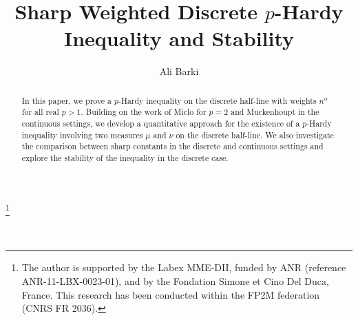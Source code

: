 \documentclass[11pt]{amsart}
\title{\small Sharp Weighted Discrete 
$p$-Hardy Inequality and Stability}
\author{Ali Barki} %
\date{} %
\newcommand{\1}{[1]}
\begin{document}
\thanks{The author is supported by the Labex MME-DII, funded by ANR (reference ANR-11-LBX-0023-01), and by the Fondation Simone et Cino Del Duca, France. This research has been conducted within the FP2M federation (CNRS FR 2036).}


\address{MODAL'X, UPL, Univ. Paris Nanterre, CNRS, F92000 Nanterre France}

\address{Department of Mathematics, Imperial College London,
180 Queen’s Gate, SW7 2AZ, London, \phantom{...} United Kingdom}

\maketitle
\begin{abstract} In this paper,
we prove a $p$-Hardy inequality on the discrete half-line with weights $n^{\alpha}$ for all real $p > 1$. Building on the work of Miclo for $p = 2$ and Muckenhoupt in the continuous settings, we develop a quantitative approach for the existence of a $p$-Hardy inequality involving two measures $\mu$ and $\nu$ on the discrete half-line. We also investigate the comparison between sharp constants in the discrete and continuous settings and explore the stability of the inequality in the discrete case.
\end{abstract} 
\phantom{.} \\ 
\end{document}
